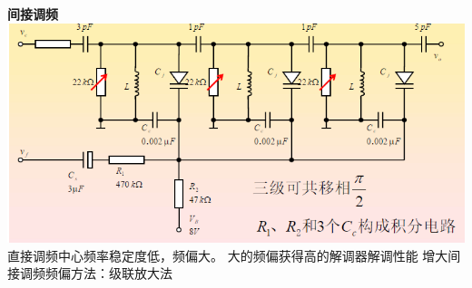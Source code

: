 \documentclass[10.5pt,landscape]{article}
\begin{document}
\begin{multicols*}{4}
\textbf{间接调频} \newline
 \includegraphics[scale=0.4]{间接调频}\newline
 直接调频中心频率稳定度低，频偏大。\newline
 大的频偏获得高的解调器解调性能\newline
 增大间接调频频偏方法：级联放大法 \newline
 

\end{multicols*}
\end{document}

